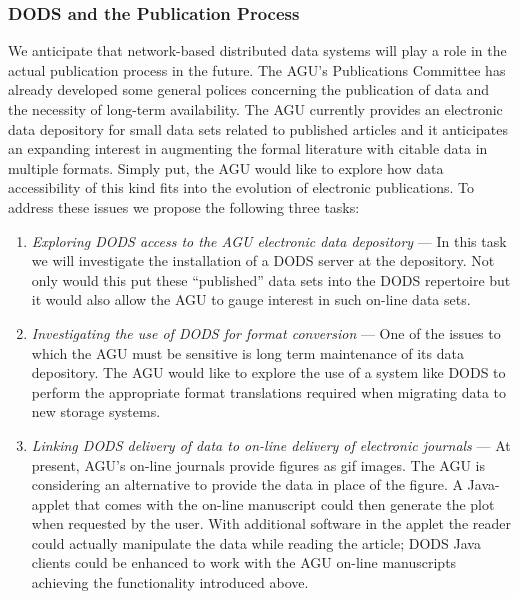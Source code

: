 \documentclass[12pt]{article}
\begin{document}
\subsubsection{\ac{DODS} and the Publication Process}
\label{publication-process}

We anticipate that network-based 
distributed data systems will play a role in the actual publication 
process in the future. The \ac{AGU}'s Publications Committee has 
already developed some general polices concerning the publication of 
data and the necessity of long-term availability. The \ac{AGU} 
currently provides an electronic data depository for small data sets 
related to published articles and it anticipates an expanding interest 
in augmenting the formal literature with citable data in multiple 
formats. Simply put, the \ac{AGU} would like to explore how data 
accessibility of this kind fits into the evolution of electronic 
publications. To address these issues we propose the following three tasks:

\begin{enumerate}
\item \emph{Exploring \ac{DODS} access to the \ac{AGU} electronic data 
depository} --- In this task we will investigate the installation
of a \ac{DODS} server at the depository. Not only would this put these 
``published'' data sets into the \ac{DODS} repertoire but it would
also allow the \ac{AGU} to gauge interest in such on-line data sets.

\item \emph{Investigating the use of \ac{DODS} for format conversion} 
--- One of the issues to which the \ac{AGU} must be sensitive is long 
term maintenance of its data depository. The \ac{AGU} would like to 
explore the use of a system like \ac{DODS} to perform the appropriate 
format translations required when migrating data to new storage systems.

\item \emph{Linking \ac{DODS} delivery of data to on-line delivery of 
electronic journals} --- At present, \ac{AGU}'s on-line journals provide
figures as gif images. The \ac{AGU} is considering an alternative to
provide the data in place of the figure. A Java-applet that comes 
with the on-line manuscript could then generate the plot when
requested by the user. With additional software in the applet the 
reader could actually manipulate the data while reading the article;
\ac{DODS} Java clients could be enhanced to work with the \ac{AGU} 
on-line manuscripts achieving the functionality introduced above. 
\end{enumerate}
\end{document}
